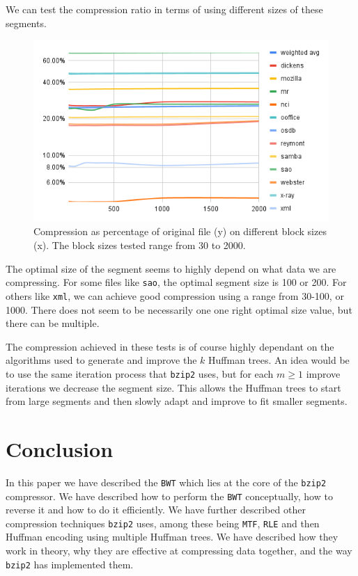 \documentclass{article}
\begin{document}
We can test the compression ratio in terms of using different sizes of these segments.
\begin{figure}[H]
    \centering
    \includegraphics[width=\textwidth]{images/HuffmanTreeBlockSizes.png}
    \caption{Compression as percentage of original file (y) on different block sizes (x). The block sizes tested range from 30 to 2000.}
\end{figure}
The optimal size of the segment seems to highly depend on what data we are compressing. For some files like \texttt{sao}, the optimal segment size is 100 or 200. For others like \texttt{xml}, we can achieve good compression using a range from 30-100, or 1000. There does not seem to be necessarily one one right optimal size value, but there can be multiple.

The compression achieved in these tests is of course highly dependant on the algorithms used to generate and improve the \(k\) Huffman trees.
An idea would be to use the same iteration process that \texttt{bzip2} uses, but for each \(m \geq 1\) improve iterations we decrease the segment size. This allows the Huffman trees to start from large segments and then slowly adapt and improve to fit smaller segments.




\section{Conclusion}
In this paper we have described the \texttt{BWT} which lies at the core of the \texttt{bzip2} compressor. We have described how to perform the \texttt{BWT} conceptually, how to reverse it and how to do it efficiently. We have further described other compression techniques \texttt{bzip2} uses, among these being \texttt{MTF}, \texttt{RLE} and then Huffman encoding using multiple Huffman trees. We have described how they work in theory, why they are effective at compressing data together, and the way \texttt{bzip2} has implemented them.
\end{document}
